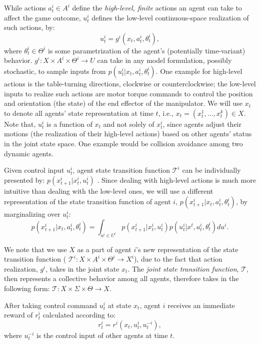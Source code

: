\documentclass[letterpaper, 10 pt, conference]{ieeeconf}  %
\begin{document}
While actions $a_t^i \in A^i$ define the \textit{high-level, finite} actions an 
agent can take to affect the game outcome, $u_t^i$ defines the low-level continuous-space
realization of such actions, by:
\begin{equation}\label{eq:g_function}
  u_t^i = g^i(x_t, a^i_t, \theta^i_t),
\end{equation}
where $\theta^i_t \in \Theta^i$ is some parametrization of the agent's (potentially time-variant) behavior.
$g^i:X \times A^i \times \Theta^i \rightarrow U$ can take in any model 
formulation, possibly stochastic, to sample inputs from $p(u_t^i|x_t,a^i_t,\theta_t^i)$. 
One example for high-level actions is the table-turning directions, clockwise 
or counterclockwise; the 
low-level inputs to realize such actions are motor torque commands to 
control the position and orientation (the state) of the end effector of the 
manipulator. We will use $x_t$ 
to denote all agents' state representation at 
time $t$, i.e., $x_t = (x^1_t,\ldots,x^k_t) \in X$. Note that, $u_t^i$ is a 
function of $x_t$ and not solely of $x^i_t$, since agents adjust their 
motions (the realization of their high-level actions) based on other agents' 
status in the joint state space. One example would be collision avoidance 
among two dynamic agents.

Given control input $u_t^i$, agent state transition function $\mathcal{T}^i$ 
can be individually presented by: $p(x^i_{t+1}|x^i_t,u^i_t)$
. Since dealing with high-level actions is much more intuitive than dealing with 
the low-level ones, we will use a different representation of the state 
transition function of agent $i$, $p(x^i_{t+1}|x_t,a^i_t,\theta^i_t)$, by marginalizing over $u^i_t$:
\begin{equation}
  p(x^i_{t+1}|x_t,a^i_t,\theta^i_t) = \int_{u^i \in U^i} 
  p(x_{t+1}^i|x^i_t,u^i_t) p(u^i_t|x^t,a^i_t,\theta^i_t)du^i.
\end{equation}

We note that we use $X$ as a part of agent $i$'s new representation of the 
state transition function (
$\mathcal{T}^i:X \times A^i \times \Theta^i \rightarrow X^i$), due to the fact 
that action realization, $g^i$, takes in the joint state $x_t$. The \textit{joint state 
transition function}, $\mathcal{T}$, then represents a collective behavior 
among all agents, therefore takes in the following form: 
$\mathcal{T}:X \times \Sigma \times \Theta \rightarrow X$. 

After taking control command $u_t^i$ at state $x_t$, agent $i$ receives an immediate reward of $r^i_t$ calculated according to: 
\begin{equation}\label{eq:r_control_input}
  r^i_t = r^i(x_t,u^i_t,u^{-i}_t),
\end{equation}
where $u^{-i}_t$ is the control input of other agents at time $t$. 
\end{document}
